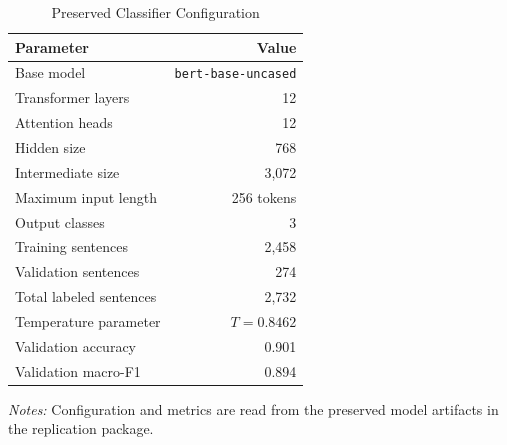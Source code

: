 \begin{table}[htbp]
\centering
\small
\caption{Preserved Classifier Configuration}
\label{tab:classifier}
\begin{threeparttable}
\begin{tabular}{lr}
\toprule
Parameter & Value \\
\midrule
Base model & \texttt{bert-base-uncased} \\
Transformer layers & 12 \\
Attention heads & 12 \\
Hidden size & 768 \\
Intermediate size & 3,072 \\
Maximum input length & 256 tokens \\
Output classes & 3 \\
Training sentences & 2,458 \\
Validation sentences & 274 \\
Total labeled sentences & 2,732 \\
Temperature parameter & $T = 0.8462$ \\
Validation accuracy & 0.901 \\
Validation macro-F1 & 0.894 \\
\bottomrule
\end{tabular}
\begin{tablenotes}[flushleft]\footnotesize
\item \textit{Notes:} Configuration and metrics are read from the preserved model artifacts in the replication package.
\end{tablenotes}
\end{threeparttable}
\end{table}
